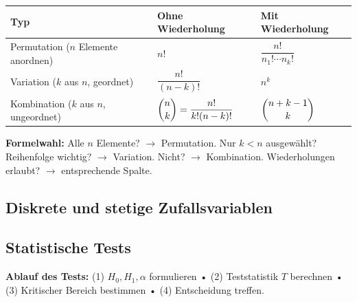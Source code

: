 \begin{center}
    \small
    \begin{tabular}{|l|l|l|}
        \hline
        \textbf{Typ}                          & \textbf{Ohne Wiederholung}             & \textbf{Mit Wiederholung}     \\
        \hline
        Permutation ($n$ Elemente anordnen)   & $n!$                                   & $\dfrac{n!}{n_1!\cdots n_k!}$ \\[8pt]
        \hline
        Variation ($k$ aus $n$, geordnet)     & $\dfrac{n!}{(n-k)!}$                   & $n^k$                         \\[8pt]
        \hline
        Kombination ($k$ aus $n$, ungeordnet) & $\dbinom{n}{k} = \dfrac{n!}{k!(n-k)!}$ & $\dbinom{n+k-1}{k}$           \\[8pt]
        \hline
    \end{tabular}
\end{center}

\textbf{Formelwahl:} Alle $n$ Elemente? $\to$ Permutation. Nur $k < n$ ausgewählt? Reihenfolge wichtig? $\to$ Variation. Nicht? $\to$ Kombination. Wiederholungen erlaubt? $\to$ entsprechende Spalte.

\subsection{Diskrete und stetige Zufallsvariablen}
\newpage

\subsection{Statistische Tests}




\textbf{Ablauf des Tests:}
(1) $H_0, H_1, \alpha$ formulieren • (2) Teststatistik $T$ berechnen • (3) Kritischer Bereich bestimmen • (4) Entscheidung treffen.

